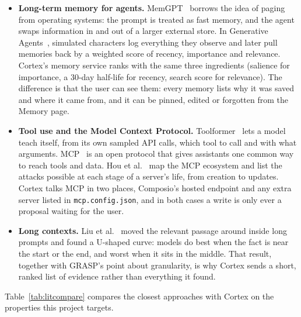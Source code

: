 \documentclass[oneside,a4paper,12pt]{report}
\begin{document}
\begin{itemize}
\item \textbf{Long-term memory for agents.} MemGPT~\cite{packer2023memgpt} borrows the idea of paging from operating systems: the prompt is treated as fast memory, and the agent swaps information in and out of a larger external store. In Generative Agents~\cite{park2023generative}, simulated characters log everything they observe and later pull memories back by a weighted score of recency, importance and relevance. Cortex's memory service ranks with the same three ingredients (salience for importance, a 30-day half-life for recency, search score for relevance). The difference is that the user can see them: every memory lists why it was saved and where it came from, and it can be pinned, edited or forgotten from the Memory page.

\item \textbf{Tool use and the Model Context Protocol.} Toolformer~\cite{schick2023toolformer} lets a model teach itself, from its own sampled API calls, which tool to call and with what arguments. MCP~\cite{anthropic2024mcp} is an open protocol that gives assistants one common way to reach tools and data. Hou et al.~\cite{hou2025mcp} map the MCP ecosystem and list the attacks possible at each stage of a server's life, from creation to updates. Cortex talks MCP in two places, Composio's hosted endpoint and any extra server listed in \texttt{mcp.config.json}, and in both cases a write is only ever a proposal waiting for the user.

\item \textbf{Long contexts.} Liu et al.~\cite{liu2024lost} moved the relevant passage around inside long prompts and found a U-shaped curve: models do best when the fact is near the start or the end, and worst when it sits in the middle. That result, together with GRASP's point about granularity, is why Cortex sends a short, ranked list of evidence rather than everything it found.
\end{itemize}

Table~\ref{tab:litcompare} compares the closest approaches with Cortex on the properties this project targets.
\end{document}
